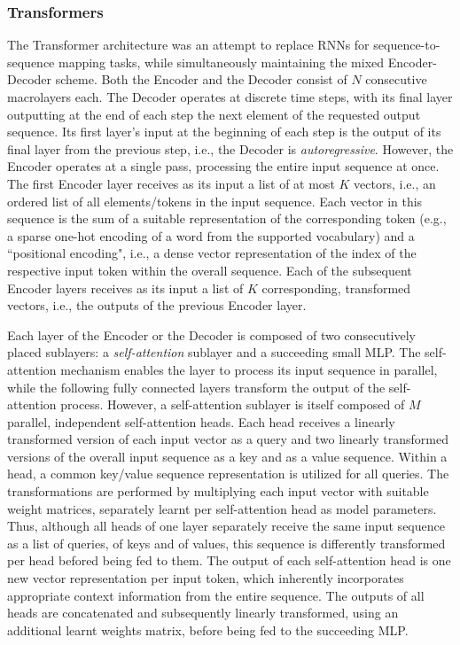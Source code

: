 \documentclass[preprint,review,10pt]{elsarticle}
\begin{document}
	\subsubsection{Transformers}
	The Transformer architecture \cite{ilia} was an attempt to replace RNNs for sequence-to-sequence mapping tasks, while simultaneously maintaining the mixed Encoder-Decoder scheme. Both the Encoder and the Decoder consist of $N$ consecutive macrolayers each. The Decoder operates at discrete time steps, with its final layer outputting at the end of each step the next element of the requested output sequence. Its first layer's input at the beginning of each step is the output of its final layer from the previous step, i.e., the Decoder is \textit{autoregressive}. However, the Encoder operates at a single pass, processing the entire input sequence at once. The first Encoder layer receives as its input a list of at most $K$ vectors, i.e., an ordered list of all elements/tokens in the input sequence. Each vector in this sequence is the sum of a suitable representation of the corresponding token (e.g., a sparse one-hot encoding of a word from the supported vocabulary) and a ``positional encoding", i.e., a dense vector representation of the index of the respective input token within the overall sequence. Each of the subsequent Encoder layers receives as its input a list of $K$ corresponding, transformed vectors, i.e., the outputs of the previous Encoder layer.
	
	Each layer of the Encoder or the Decoder is composed of two consecutively placed sublayers: a \textit{self-attention} sublayer and a succeeding small MLP. The self-attention mechanism enables the layer to process its input sequence in parallel, while the following fully connected layers transform the output of the self-attention process. However, a self-attention sublayer is itself composed of $M$ parallel, independent self-attention heads. Each head receives a linearly transformed version of each input vector as a query and two linearly transformed versions of the overall input sequence as a key and as a value sequence. Within a head, a common key/value sequence representation is utilized for all queries. The transformations are performed by multiplying each input vector with suitable weight matrices, separately learnt per self-attention head as model parameters. Thus, although all heads of one layer separately receive the same input sequence as a list of queries, of keys and of values, this sequence is differently transformed per head befored being fed to them. The output of each self-attention head is one new vector representation per input token, which inherently incorporates appropriate context information from the entire sequence. The outputs of all heads are concatenated and subsequently linearly transformed, using an additional learnt weights matrix, before being fed to the succeeding MLP.
	
\end{document}
